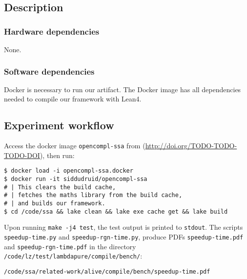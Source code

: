 \documentclass{sigplanconf}
\begin{document}
\subsection{Description}

\subsubsection{Hardware dependencies}

None.

\subsubsection{Software dependencies}

Docker is necessary to run our artifact. The Docker image has all dependencies needed to compile our framework with Lean4.



\subsection{Experiment workflow}

Access the docker image \texttt{opencompl-ssa} from
(\url{http://doi.org/TODO-TODO-TODO-DOI}), then run:

\begin{verbatim}
$ docker load -i opencompl-ssa.docker
$ docker run -it siddudruid/opencompl-ssa
# | This clears the build cache,
# | fetches the maths library from the build cache,
# | and builds our framework.
$ cd /code/ssa && lake clean && lake exe cache get && lake build
\end{verbatim}


Upon running \texttt{make -j4 test}, the test output is printed to \texttt{stdout}.
The scripts \texttt{speedup-time.py} and \texttt{speedup-rgn-time.py},
produce PDFs \texttt{speedup-time.pdf} and \texttt{speedup-rgn-time.pdf}
in the directory \texttt{/code/lz/test/lambdapure/compile/bench/}:

\begin{verbatim}
/code/ssa/related-work/alive/compile/bench/speedup-time.pdf
\end{verbatim}
\end{document}

